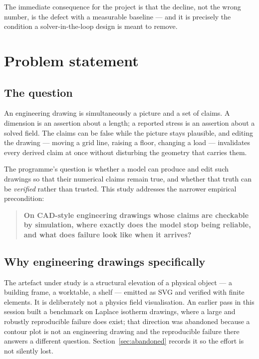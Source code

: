 \documentclass[11pt,a4paper]{article}
\begin{document}
The immediate consequence for the project is that the decline, not the wrong number, is the defect
with a measurable baseline --- and it is precisely the condition a solver-in-the-loop design is meant
to remove.

\section{Problem statement}

\subsection{The question}

An engineering drawing is simultaneously a picture and a set of claims. A dimension is an assertion
about a length; a reported stress is an assertion about a solved field. The claims can be false while
the picture stays plausible, and editing the drawing --- moving a grid line, raising a floor, changing
a load --- invalidates every derived claim at once without disturbing the geometry that carries them.

The programme's question is whether a model can produce and edit such drawings so that their numerical
claims remain true, and whether that truth can be \emph{verified} rather than trusted. This study
addresses the narrower empirical precondition:

\begin{quote}
\textbf{On CAD-style engineering drawings whose claims are checkable by simulation, where exactly does
the model stop being reliable, and what does failure look like when it arrives?}
\end{quote}

\subsection{Why engineering drawings specifically}

The artefact under study is a structural elevation of a physical object --- a building frame, a
worktable, a shelf --- emitted as SVG and verified with finite elements. It is deliberately not a
physics field visualisation. An earlier pass in this session built a benchmark on Laplace isotherm
drawings, where a large and robustly reproducible failure does exist; that direction was abandoned
because a contour plot is not an engineering drawing and the reproducible failure there answers a
different question. Section~\ref{sec:abandoned} records it so the effort is not silently lost.
\end{document}
